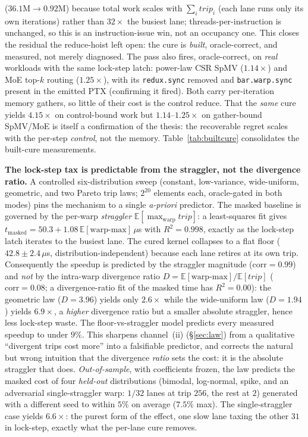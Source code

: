 \documentclass[manuscript,review,anonymous]{acmart}
\begin{document}
($36.1\mathrm{M}\rightarrow0.92\mathrm{M}$) because total work scales with $\sum_i \mathit{trip}_i$ (each
lane runs only its own iterations) rather than $32\times$ the busiest lane; threads-per-instruction is
unchanged, so this is an instruction-issue win, not an occupancy one. This closes the residual the
reduce-hoist left open: the cure is \emph{built}, oracle-correct, and measured, not merely diagnosed. The pass also fires, oracle-correct, on \emph{real} workloads with the same lock-step
latch: power-law CSR SpMV ($1.14\times$) and MoE top-$k$ routing ($1.25\times$), with its
\texttt{redux.sync} removed and \texttt{bar.warp.sync} present in the emitted PTX (confirming it fired).
Both carry per-iteration memory gathers, so little of their cost is the control reduce. That the \emph{same}
cure yields $4.15\times$ on control-bound work but $1.14$--$1.25\times$ on gather-bound SpMV/MoE is itself a
confirmation of the thesis: the recoverable regret scales with the per-step \emph{control}, not the memory.
Table~\ref{tab:builtcure} consolidates the built-cure measurements.

\textbf{The lock-step tax is predictable from the straggler, not the divergence ratio.} A controlled six-distribution sweep (constant, low-variance, wide-uniform, geometric, and two Pareto trip laws; $2^{20}$ elements each, oracle-gated in both modes) pins the mechanism to a single \emph{a-priori} predictor. The masked baseline is governed by the per-warp \emph{straggler} $\mathbb{E}[\max_{\mathrm{warp}}\mathit{trip}]$: a least-squares fit gives $t_{\mathrm{masked}}=50.3+1.08\,\mathbb{E}[\text{warp-max}]\,\mu$s with $R^2=0.998$, exactly as the lock-step latch iterates to the busiest lane. The cured kernel collapses to a flat floor ($42.8\pm2.4\,\mu$s, distribution-independent) because each lane retires at its own trip. Consequently the speedup is predicted by the straggler magnitude ($\mathrm{corr}=0.99$) and \emph{not} by the intra-warp divergence ratio $D=\mathbb{E}[\text{warp-max}]/\mathbb{E}[\mathit{trip}]$ ($\mathrm{corr}=0.08$; a divergence-ratio fit of the masked time has $R^2=0.00$): the geometric law ($D=3.96$) yields only $2.6\times$ while the wide-uniform law ($D=1.94$) yields $6.9\times$, a \emph{higher} divergence ratio but a smaller absolute straggler, hence less lock-step waste. The floor-vs-straggler model predicts every measured speedup to under $9\%$. This sharpens channel~(ii) (\S\ref{sec:law}) from a qualitative ``divergent trips cost more'' into a falsifiable predictor, and corrects the natural but wrong intuition that the divergence \emph{ratio} sets the cost: it is the absolute straggler that does. \emph{Out-of-sample}, with coefficients frozen, the law predicts the masked cost of four \emph{held-out} distributions (bimodal, log-normal, spike, and an adversarial single-straggler warp: $1/32$ lanes at trip $256$, the rest at $2$) generated with a different seed to within $5\%$ on average ($7.5\%$ max). The single-straggler case yields $6.6\times$: the purest form of the effect, one slow lane taxing the other $31$ in lock-step, exactly what the per-lane cure removes.
\end{document}
